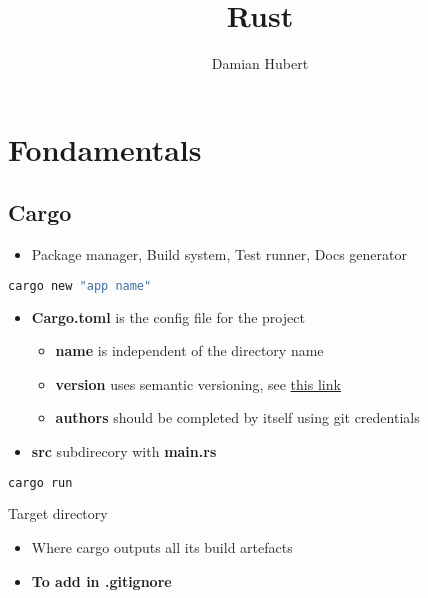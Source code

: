 \documentclass{report}
\author{Damian Hubert}
\title{Rust}
\begin{document}
\maketitle
\tableofcontents



\chapter{Fondamentals}


\section{Cargo}
\begin{itemize}
	\item Package manager, Build system, Test runner, Docs generator
\end{itemize}

\begin{tcolorbox}[title=Creating Project,colback=backcolour]
\begin{lstlisting}[language=bash]
cargo new "app name"
\end{lstlisting}
\end{tcolorbox}

\begin{itemize}
	\item \textbf{Cargo.toml} is the config file for the project
		\begin{itemize}
			\item \textbf{name} is independent of the directory name 
			\item \textbf{version} uses semantic versioning, see \href{https://semver.org}{this link} 
			\item \textbf{authors} should be completed by itself using git credentials 
		\end{itemize}
	\item \textbf{src} subdirecory with \textbf{main.rs} 
\end{itemize}

\begin{tcolorbox}[title=Running a Program,colback=backcolour]
\begin{lstlisting}[language=bash]
cargo run
\end{lstlisting}
\end{tcolorbox}

Target directory
\begin{itemize}
	\item Where cargo outputs all its build artefacts 
	\item \textbf{To add in .gitignore} 
\end{itemize}
\end{document}
